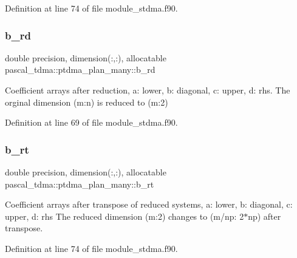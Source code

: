 Definition at line 74 of file module\+\_\+stdma.\+f90.

\mbox{\label{structpascal__tdma_1_1ptdma__plan__many_a81ed1b6910c30334e93598f7d18254a3}} 
\subsubsection{\texorpdfstring{b\_rd}{b\_rd}}
{\footnotesize\ttfamily double precision, dimension(\+:,\+:), allocatable pascal\+\_\+tdma\+::ptdma\+\_\+plan\+\_\+many\+::b\+\_\+rd}



Coefficient arrays after reduction, a\+: lower, b\+: diagonal, c\+: upper, d\+: rhs. The orginal dimension (m\+:n) is reduced to (m\+:2) 



Definition at line 69 of file module\+\_\+stdma.\+f90.

\mbox{\label{structpascal__tdma_1_1ptdma__plan__many_aab84eff7c823d47acb5388cd4e2a790a}} 
\subsubsection{\texorpdfstring{b\_rt}{b\_rt}}
{\footnotesize\ttfamily double precision, dimension(\+:,\+:), allocatable pascal\+\_\+tdma\+::ptdma\+\_\+plan\+\_\+many\+::b\+\_\+rt}



Coefficient arrays after transpose of reduced systems, a\+: lower, b\+: diagonal, c\+: upper, d\+: rhs The reduced dimension (m\+:2) changes to (m/np\+: 2$\ast$np) after transpose. 



Definition at line 74 of file module\+\_\+stdma.\+f90.

\mbox{\label{structpascal__tdma_1_1ptdma__plan__many_a56b15fe2b742c06106a46da7a720d9fd}} 
